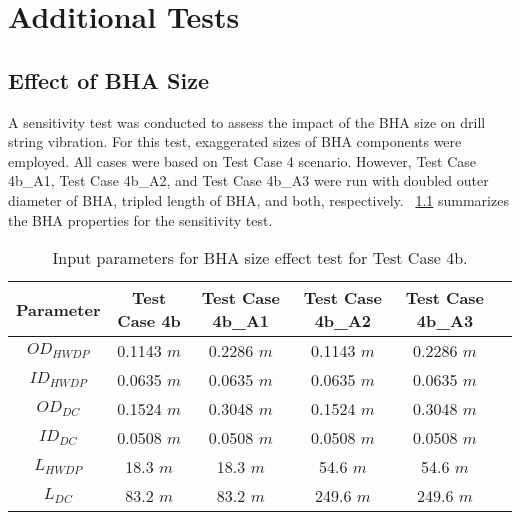 \chapter{Additional Tests}
\section{Effect of BHA Size}
A sensitivity test was conducted to assess the impact of the BHA size on drill string vibration. For this test, exaggerated sizes of BHA components were employed. All cases were based on Test Case 4 scenario. However, Test Case 4b\_A1, Test Case 4b\_A2, and Test Case 4b\_A3 were run with doubled outer diameter of BHA, tripled length of BHA, and both, respectively. \tablename~\ref{table_sensitivity_size_4b_input} summarizes the BHA properties for the sensitivity test.
\begin{table}
    \centering
    \begin{tabular}{|c|c|c|c|c|c|}
       \hline
       \textbf{Parameter} & \textbf{Test Case 4b} & \textbf{Test Case 4b\_A1} & \textbf{Test Case 4b\_A2} & \textbf{Test Case 4b\_A3}\\
       \hline
       $OD_{HWDP}$ & 0.1143 $m$ & 0.2286 $m$ & 0.1143 $m$ & 0.2286 $m$ \\
       \hline
       $ID_{HWDP}$ & 0.0635 $m$ & 0.0635 $m$ & 0.0635 $m$ & 0.0635 $m$ \\
       \hline
       $OD_{DC}$ & 0.1524 $m$ & 0.3048 $m$ & 0.1524 $m$ & 0.3048 $m$ \\
       \hline
       $ID_{DC}$ & 0.0508 $m$ & 0.0508 $m$ & 0.0508 $m$ & 0.0508 $m$ \\
       \hline
       $L_{HWDP}$ & 18.3 $m$ & 18.3 $m$ & 54.6 $m$ & 54.6 $m$ \\
       \hline
       $L_{DC}$ & 83.2 $m$ & 83.2 $m$ & 249.6 $m$ & 249.6 $m$ \\
       \hline
      \end{tabular}
    \caption[Input parameters for BHA size effect test for Test Case 4b]{Input parameters for BHA size effect test for Test Case 4b.}
    \label{table_sensitivity_size_4b_input}
\end{table}

